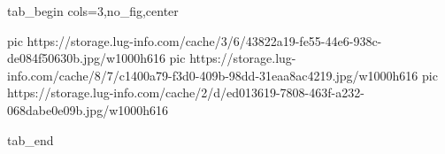  
 
 
 
 


\ifcmt
  tab_begin cols=3,no_fig,center

     pic https://storage.lug-info.com/cache/3/6/43822a19-fe55-44e6-938c-de084f50630b.jpg/w1000h616
		 pic https://storage.lug-info.com/cache/8/7/c1400a79-f3d0-409b-98dd-31eaa8ac4219.jpg/w1000h616
		 pic https://storage.lug-info.com/cache/2/d/ed013619-7808-463f-a232-068dabe0e09b.jpg/w1000h616

  tab_end
\fi
